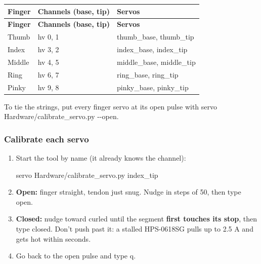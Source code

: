 \documentclass[11pt,letterpaper]{article}
\newcommand{\code}[1]{\textcolor{codeblue}{\ttfamily\smaller\relax #1}}
\begin{document}
{\small
\begin{longtable}{|>{\raggedright\arraybackslash}p{}|>{\raggedright\arraybackslash}p{}|>{\raggedright\arraybackslash}p{}|}
\hline
\rowcolor{tblhead}\textbf{Finger} & \textbf{Channels (base, tip)} & \textbf{Servos} \\ \hline
\endfirsthead
\hline
\rowcolor{tblhead}\textbf{Finger} & \textbf{Channels (base, tip)} & \textbf{Servos} \\ \hline
\endhead
Thumb & hv 0, 1 & \code{thumb\_\allowbreak{}base}, \code{thumb\_\allowbreak{}tip} \\ \hline
Index & hv 3, 2 & \code{index\_\allowbreak{}base}, \code{index\_\allowbreak{}tip} \\ \hline
Middle & hv 4, 5 & \code{middle\_\allowbreak{}base}, \code{middle\_\allowbreak{}tip} \\ \hline
Ring & hv 6, 7 & \code{ring\_\allowbreak{}base}, \code{ring\_\allowbreak{}tip} \\ \hline
Pinky & hv 9, 8 & \code{pinky\_\allowbreak{}base}, \code{pinky\_\allowbreak{}tip} \\ \hline
\end{longtable}}

To tie the strings, put every finger servo at its open pulse with \code{servo Hardware/\allowbreak{}calibrate\_\allowbreak{}servo.py -{}-{}open}.


\subsubsection*{Calibrate each servo}
\begin{enumerate}
  \item Start the tool by name (it already knows the channel):
\begin{codeblock}
servo Hardware/calibrate_servo.py index_tip
\end{codeblock}
  \item \textbf{Open:} finger straight, tendon just snug. Nudge in steps of 50, then type \code{open}.
  \item \textbf{Closed:} nudge toward curled until the segment \textbf{first touches its stop}, then type \code{closed}. Don't push past it: a stalled HPS-0618SG pulls up to 2.5 A and gets hot within seconds.
  \item Go back to the open pulse and type \code{q}.
\end{enumerate}
\end{document}
